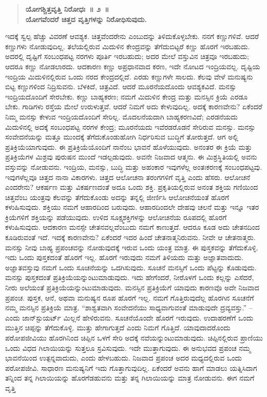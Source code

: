 \begin{verse}
\textbf{ಯೋಗಶ್ಚಿತ್ತವೃತ್ತಿ ನಿರೋಧಃ~॥ ೨~॥\\ಯೋಗವೆಂದರೆ ಚಿತ್ತದ ವೃತ್ತಿಗಳನ್ನು ನಿರೋಧಿಸುವುದು. }
\end{verse}

ಇದಕ್ಕೆ ಸ್ವಲ್ಪ ಹೆಚ್ಚು ವಿವರಣೆ ಆವಶ್ಯಕ. ಚಿತ್ತವೆಂದರೇನು ಎಂಬುದನ್ನು ತಿಳಿದುಕೊಳ್ಳಬೇಕು. ನನಗೆ ಕಣ್ಣುಗಳಿವೆ. ಆದರೆ ಕಣ್ಣುಗಳು ನೋಡುವುದಿಲ್ಲ. ತಲೆಯಲ್ಲಿರುವ ಮಿದುಳಿನ ಕೇಂದ್ರವನ್ನು ತೆಗೆದುಬಿಟ್ಟರೆ ಕಣ್ಣು ಹೊರಗೆ ಇರಬಹುದು. ಅದರಲ್ಲಿ ದೃಷ್ಟಿಗೆ ಸಂಬಂಧಪಟ್ಟ ನರಗಳು ಪೂರ್ತಿ ಇರಬಹುದು; ಅದರ ಮೇಲೆ ವಸ್ತುವಿನ ಚಿತ್ರವೂ ಇರಬಹುದು; ಆದರೂ ಕಣ್ಣು ನೋಡಲಾರದು. ಆದಕಾರಣ ಕಣ್ಣು ಅಪ್ರಧಾನವಾದ ಕರಣ, ಇದೇ ನೋಟದ ಇಂದ್ರಿಯವಲ್ಲ. ದೃಷ್ಟಿಯ ಇಂದ್ರಿಯ ಮಿದುಳಿನಲ್ಲಿರುವ ಒಂದು ನರದ ಕೇಂದ್ರದಲ್ಲಿದೆ. ಎರಡು ಕಣ್ಣುಗಳೇ ಸಾಲದು. ಕೆಲವು ವೇಳೆ ಮನುಷ್ಯನು ಬಿಟ್ಟ ಕಣ್ಣುಗಳಿಂದ ನಿದ್ರಿಸುವನು. ಬೆಳಕಿದೆ, ಚಿತ್ರವಿದೆ. ಆದರೆ ಮೂರನೆಯದೊಂದು ಆವಶ್ಯಕವಿದೆ. ಮನಸ್ಸು ಇಂದ್ರಿಯದೊಂದಿಗೆ ಸೇರಬೇಕು. ಕಣ್ಣು ಬಾಹ್ಯಕರಣ; ನಮಗೆ ಮಿದುಳಿನ ಕೇಂದ್ರ ಮತ್ತು ಮನಸ್ಸಿನ ಕ್ರಿಯೆ ಎರಡೂ ಬೇಕು. ಗಾಡಿಗಳು ರಸ್ತೆಯ ಮೇಲೆ ಉರುಳುತ್ತವೆ. ಆದರೆ ನಿಮಗೆ ಅದು ಕೇಳುವುದಿಲ್ಲ. ಅದಕ್ಕೆ ಕಾರಣವೇನು? ಏಕೆಂದರೆ ನಿಮ್ಮ ಮನಸ್ಸು ಕೇಳುವ ಇಂದ್ರಿಯದೊಂದಿಗೆ ಸೇರಿಲ್ಲ. ಮೊದಲನೆಯದಾಗಿ ಬಾಹ್ಯಕರಣವಿದೆ; ಎರಡನೆಯದು ಮಿದುಳಿನಲ್ಲಿ ಅದಕ್ಕೆ ಸಂಬಂಧಪಟ್ಟ ನರಗಳ ಕೇಂದ್ರ; ಮೂರನೆಯದು ಇವೆರಡರೊಡನೆ ಸೇರಿರುವ ಮನಸ್ಸು. ಮನಸ್ಸು ಸಂವೇದನೆಯನ್ನು ಮತ್ತೂ ಮುಂದಕ್ಕೆ ತೆಗೆದುಕೊಂಡುಹೋಗಿ ನಿರ್ಧರಿಸುವ ಬುದ್ಧಿಗೆ ತೋರುತ್ತದೆ. ಆಗ ಅಲ್ಲಿ ಪ್ರತಿಕ್ರಿಯೆಯಾಗುವುದು. ಈ ಪ್ರತಿಕ್ರಿಯೆಯೊಂದಿಗೆ ನಾನೆಂಬ ಭಾವನೆ ಹೊಳೆಯುವುದು. ಅನಂತರ ಈ ಕ್ರಿಯೆ ಮತ್ತು ಪ್ರತಿಕ್ರಿಯೆಗಳ ಮಿಶ್ರವು ಪುರುಷನ ಮುಂದೆ ಇಡಲ್ಪಡುವುದು. ಅವನೇ ನಿಜವಾದ ಆತ್ಮನು. ಈ ಮಿಶ್ರಸ್ಥಿತಿಯಲ್ಲಿ ಅವನು ವಸ್ತುವನ್ನು ನೋಡುವನು. ಇಂದ್ರಿಯ, ಮನಸ್ಸು, ಬುದ್ಧಿ ಮತ್ತು ಅಹಂಕಾರ ಇವುಗಳೆಲ್ಲ ಅಂತಃಕರಣಕ್ಕೆ ಸಂಬಂಧಪಟ್ಟವು. ಇವುಗಳೆಲ್ಲವೂ ಚಿತ್ತದ ನಾನಾ ವಿಕಾರಗಳು. ಚಿತ್ತದ ಆಲೋಚನಾ ತರಂಗಗಳಿಗೆ ವೃತ್ತಿ ಎಂದು ಹೆಸರು. ಆಲೋಚನೆ ಎಂದರೇನು? ಆಕರ್ಷಣ ಮತ್ತು ವಿಕರ್ಷಣದಂತೆ ಅದೂ ಒಂದು ಶಕ್ತಿ. ಪ್ರಕೃತಿಯಲ್ಲಿರುವ ಅನಂತ ಶಕ್ತಿಯ ಗಣಿಯಿಂದ ಚಿತ್ತವೆಂಬ ಯಂತ್ರವು ಕೆಲವನ್ನು ತೆಗೆದುಕೊಂಡು ಅದನ್ನು ತನ್ನಲ್ಲಿ ಜೀರ್ಣಿಸಿ ಆಲೋಚನೆಯಂತೆ ಹೊರಗೆ ಕಳುಹಿಸುವುದು. ಶಕ್ತಿಯು ನಮಗೆ ಆಹಾರದಿಂದ ಬರುವುದು. ಆಹಾರದಿಂದಲೇ ದೇಹವು ಚಲನೆ ಮತ್ತು ಇನ್ನೂ ಇತರ ಕ್ರಿಯೆಗಳಿಗೆ ಶಕ್ತಿಯನ್ನು ಪಡೆಯುವುದು. ಉಳಿದ ಸೂಕ್ಷ್ಮಶಕ್ತಿಗಳನ್ನು ಆಲೋಚನೆಯ ರೂಪದಲ್ಲಿ ಹೊರಗೆ ಕಳುಹಿಸುವುದು. ಆದಕಾರಣ ಮನಸ್ಸೇ ಚೇತನವಲ್ಲವೆಂಬುದು ನಮಗೆ ಕಾಣುತ್ತದೆ. ಆದರೂ ಕೂಡ ಅದು ಚೇತನದಿಂದ ಕೂಡಿರುವಂತೆ ಇದೆ. ಇದಕ್ಕೆ ಕಾರಣವೇನು? ಏಕೆಂದರೆ ಇದರ ಹಿಂದೆ ಚೇತನಾತ್ಮನಿರುವನು. ನೀವೇ ಆ ಚೇತನಾತ್ಮರು. ಮನಸ್ಸು ನೀವು ಬಾಹ್ಯ ಪ್ರಪಂಚವನ್ನು ನೋಡುವುದಕ್ಕೆ ಇರುವ ಒಂದು ಯಂತ್ರ ಮಾತ್ರ. ಈ ಪುಸ್ತಕವನ್ನು ತೆಗೆದುಕೊಳ್ಳಿ. ಇದು ಒಂದು ಪುಸ್ತಕದಂತೆ ಹೊರಗೆ ಇಲ್ಲ. ಹೊರಗೆ ಇರುವುದು ನಮಗೆ ತಿಳಿಯದು ಮತ್ತು ಅಜ್ಞಾತವಾದುದು. ಅಜ್ಞಾತವಸ್ತುವು ನಮಗೆ ಒಂದು ಸೂಚನೆಯನ್ನು ಒದಗಿಸುವುದು. ಸೂಚನೆ ಮನಸ್ಸಿಗೆ ಒಂದು ಪೆಟ್ಟನ್ನು ಕೊಡುವುದು. ಮನಸ್ಸು ಪುಸ್ತಕದಂತೆ ಪ್ರತಿಕ್ರಿಯೆಯನ್ನುಂಟುಮಾಡುವುದು. ಇದು ಹೇಗೆಂದರೆ, ನೀರೊಳಗೆ ಒಂದು ಕಲ್ಲನ್ನು ಎಸೆದರೆ, ನೀರು ಅಲೆಯಂತೆ ಪ್ರತಿಕ್ರಿಯೆಯನ್ನುಂಟುಮಾಡುವುದು. ಮನಸ್ಸಿನ ಪ್ರತಿಕ್ರಿಯೆಗೆ ಯಾವುದು ಕಾರಣವೊ ಅದೇ ನಿಜವಾದ ಪ್ರಪಂಚ. ಪುಸ್ತಕ, ಆನೆ, ಅಥವಾ ಮನುಷ್ಯನ ರೂಪ ಹೊರಗೆ ಇಲ್ಲ. ನಮಗೆ ಗೊತ್ತಿರುವುದೆಲ್ಲ ಹೊರಗಿನ ಸೂಚನೆಗೆ ನಮ್ಮ ಮನಸ್ಸಿನ ಪ್ರತಿಕ್ರಿಯೆ ಮಾತ್ರ. “ಶಾಶ್ವತವಾಗಿ ಸಂವೇದನೆಯು ಸಾಧ್ಯವಾಗುವಂತೆ ಮಾಡುವುದೇ ದ್ರವ್ಯವಸ್ತು.” –ಎಂದು ಜಾನ್​ಸ್ಟುಯರ್ಟ್​ ಮಿಲ್ಲನೆ ಹೇಳಿರುವನು. ಸೂಚನೆಯೊಂದೇ ಹೊರಗೆ ಇರುವುದು. ಉದಾಹರಣೆಗೆ ಒಂದು ಮುತ್ತಿನ ಚಿಪ್ಪನ್ನು ತೆಗೆದುಕೊಳ್ಳಿ. ಮುತ್ತು ಹೇಗಾಗುತ್ತದೆ ಎಂದು ನಿಮಗೆ ಗೊತ್ತಿದೆ. ಯಾವುದಾದರೊಂದು ಪರೋಪಜೀವಿಯು ಹೊರಗಿನಿಂದ ಚಿಪ್ಪಿನ ಒಳಗೆ ಸೇರಿ ಅದಕ್ಕೆ ನವೆಯನ್ನುಂಟುಮಾಡುವುದು. ಚಿಪ್ಪಿನಲ್ಲಿರುವ ಪ್ರಾಣಿಯು ಒಂದು ವಿಧದ ಗಿಲಾಯಿಯನ್ನು ಸುತ್ತಲೂ ಸ್ರವಿಸುವುದು. ಇದೇ ಮುತ್ತಾಗುವುದು. ಈ ಅನುಭವದ ಪ್ರಪಂಚ ನಮ್ಮ ಭಾವನೆಯಿಂದ ಉತ್ಪನ್ನವಾದುದು, ಎಂದು ಹೇಳಬಹುದು. ನಿಜವಾದ ಪ್ರಪಂಚ ಅದರ ಮಧ್ಯದಲ್ಲಿರುವ ಒಂದು ಪರೋಪಜೀವಿ. ಸಾಧಾರಣ ಮನುಷ್ಯನಿಗೆ ಇದು ಗೊತ್ತಾಗುವುದಿಲ್ಲ. ಏಕೆಂದರೆ ಅವನು ಹಾಗೆ ಮಾಡಲು ಯತ್ನಿಸಿದಾಗ ತನ್ನಿಂದ ತನ್ನ ಗಿಲಾಯಿಯನ್ನು ಹೊರಗೆಡಹುವನು ಮತ್ತು ತನ್ನ ಗಿಲಾಯಿಯನ್ನು ಮಾತ್ರ ನೋಡುವನು. ಈಗ ನಮಗೆ ವೃತ್ತಿ 